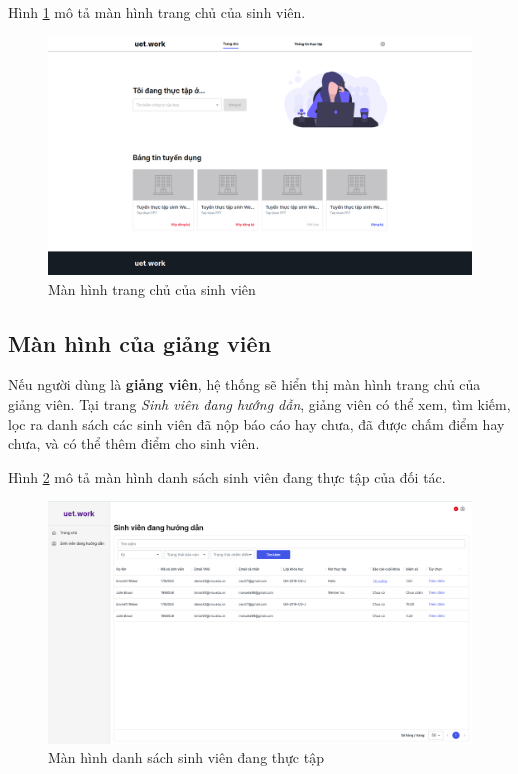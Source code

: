 \documentclass[./../main.tex]{subfiles}
\begin{document}
Hình \ref{fig:student_page} mô tả màn hình trang chủ của sinh viên.

\begin{figure}[]
	\includegraphics[width=\linewidth]{./images/image7.png}
	\caption{Màn hình trang chủ của sinh viên}
	\label{fig:student_page}
\end{figure}

\subsection{Màn hình của giảng viên}


Nếu người dùng là \textbf{giảng viên}, hệ thống sẽ hiển thị màn hình
trang chủ của giảng viên. Tại trang \emph{Sinh viên đang hướng dẫn},
giảng viên có thể xem, tìm kiếm, lọc ra danh sách các sinh viên đã nộp
báo cáo hay chưa, đã được chấm điểm hay chưa, và có thể thêm điểm cho
sinh viên.

Hình \ref{fig:working_student_page} mô tả màn hình danh sách sinh viên đang thực tập của đối tác.

\begin{figure}[]
	\includegraphics[width=\linewidth]{./images/image8.png}
	\caption{Màn hình danh sách sinh viên đang thực tập}
	\label{fig:working_student_page}
\end{figure}
\end{document}
